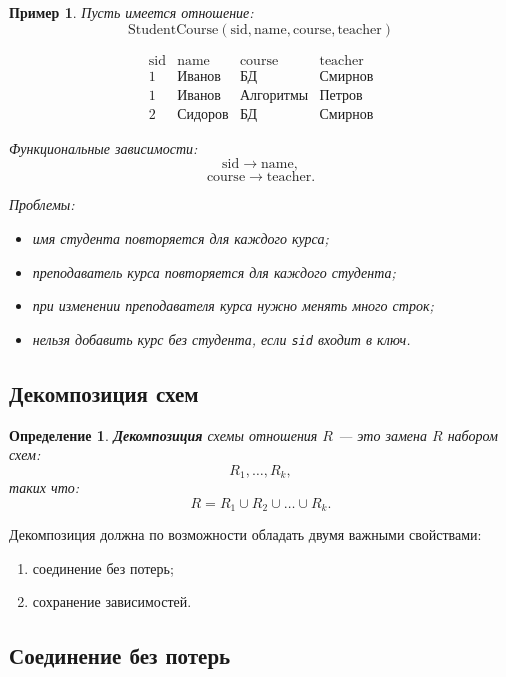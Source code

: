 \documentclass[12pt,a4paper]{article}
\newtheorem{definition}{Определение}[section]
\newtheorem{example}{Пример}[section]
\theoremstyle{remark}
\begin{document}
\begin{example}
Пусть имеется отношение:
\[
\text{StudentCourse}(\text{sid}, \text{name}, \text{course}, \text{teacher})
\]

\[
\begin{array}{c|c|c|c}
\text{sid} & \text{name} & \text{course} & \text{teacher} \\
\hline
1 & \text{Иванов} & \text{БД} & \text{Смирнов} \\
1 & \text{Иванов} & \text{Алгоритмы} & \text{Петров} \\
2 & \text{Сидоров} & \text{БД} & \text{Смирнов}
\end{array}
\]

Функциональные зависимости:
\[
\text{sid} \to \text{name},
\]
\[
\text{course} \to \text{teacher}.
\]

Проблемы:
\begin{itemize}
    \item имя студента повторяется для каждого курса;
    \item преподаватель курса повторяется для каждого студента;
    \item при изменении преподавателя курса нужно менять много строк;
    \item нельзя добавить курс без студента, если \texttt{sid} входит в ключ.
\end{itemize}
\end{example}

\subsection{Декомпозиция схем}

\begin{definition}
\textbf{Декомпозиция} схемы отношения $R$ --- это замена $R$ набором схем:
\[
R_1,\dots,R_k,
\]
таких что:
\[
R = R_1 \cup R_2 \cup \dots \cup R_k.
\]
\end{definition}

Декомпозиция должна по возможности обладать двумя важными свойствами:
\begin{enumerate}
    \item соединение без потерь;
    \item сохранение зависимостей.
\end{enumerate}

\subsection{Соединение без потерь}
\end{document}
